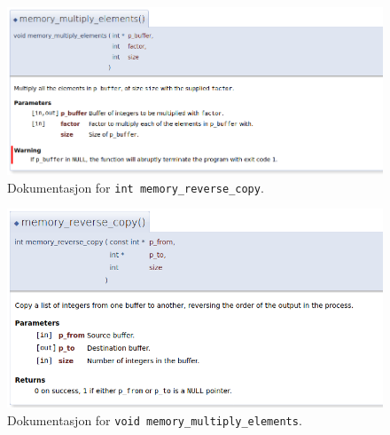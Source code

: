 \begin{alphasection}
\begin{figure}[H]
    \centering
    \includegraphics[width=135mm]{figures/doxygenfil3.png}
    \caption{Dokumentasjon for \texttt{int memory\_reverse\_copy}.}
    \label{fig:2-dox-fig3}
\end{figure}



\begin{figure}[H]
    \centering
    \includegraphics[width=135mm]{figures/doxygen4.png}
    \caption{Dokumentasjon for \texttt{void memory\_multiply\_elements}.}
    \label{fig:2-dox-fig4}
\end{figure}

\end{alphasection}


\setcounter{section}{0}